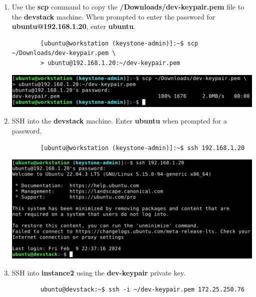 \documentclass[letterpaper, 12pt]{article}
\begin{document}
\begin{enumerate}
    \item Use the \textbf{scp} command to copy the \textbf{\texttildemid/Downloads/dev-keypair.pem} file to the \textbf{devstack} machine.
    When prompted to enter the password for \textbf{ubuntu@192.168.1.20}, enter \textbf{ubuntu}.
    \begin{lstlisting}
        [ubuntu@workstation (keystone-admin)]:~$ scp ~/Downloads/dev-keypair.pem \
        > ubuntu@192.168.1.20:~/dev-keypair.pem
    \end{lstlisting}

    \begin{center}
        \includegraphics[width=\linewidth]{images/part3/step8.png}
    \end{center}

    \item SSH into the \textbf{devstack} machine.
    Enter \textbf{ubuntu} when prompted for a password.
    \begin{lstlisting}
        [ubuntu@workstation (keystone-admin)]:~$ ssh 192.168.1.20
    \end{lstlisting}

    \begin{center}
        \includegraphics[width=\linewidth]{images/part3/step9.png}
    \end{center}

    \item SSH into \textbf{instance2} using the \textbf{dev-keypair} private key.
    \begin{lstlisting}
        ubuntu@devstack:~$ ssh -i ~/dev-keypair.pem 172.25.250.76
    \end{lstlisting}


\end{enumerate}
\end{document}
